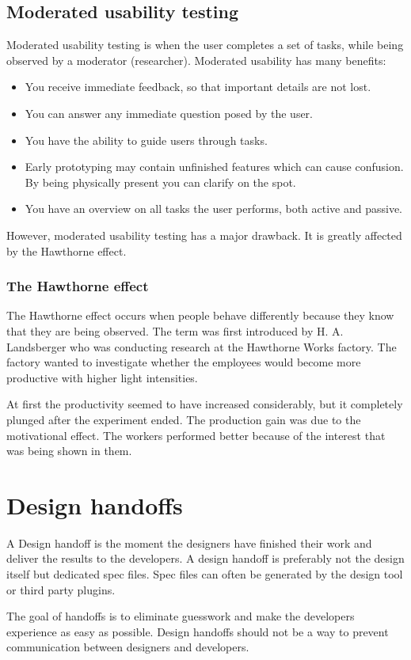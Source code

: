     \subsection{Moderated usability testing}  
    Moderated usability testing is when the user completes a set of tasks, while being observed by a moderator (researcher).
    Moderated usability has many benefits: 
    \begin{itemize}
        \setlength\itemsep{-2pt} 
        \item { You receive immediate feedback, so that important details are not lost.}
        \item { You can answer any immediate question posed by the user.}
        \item { You have the ability to guide users through tasks.}
        \item { Early prototyping may contain unfinished features which can cause confusion. By being physically present you can clarify on the spot.}
        \item { You have an overview on all tasks the user performs, both active and passive.}
    \end{itemize} 
    
    However, moderated usability testing has a major drawback. It is greatly affected by the Hawthorne effect.

    \subsubsection{The Hawthorne effect}
    The Hawthorne effect occurs when people behave differently because they know that they are being observed. The term was first introduced by H. A. Landsberger who was conducting research at the Hawthorne Works factory. The factory wanted to investigate whether the employees would become more productive with higher light intensities. 
    
    At first the productivity seemed to have increased considerably, but it completely plunged after the experiment ended. The production gain was due to the motivational effect. The workers performed better because of the interest that was being shown in them.
    
    \section{Design handoffs}
    A Design handoff is the moment the designers have finished their work and deliver the results to the developers. A design handoff is preferably not the design itself but dedicated spec files. Spec files can often be generated by the design tool or third party plugins.
    
    
    The goal of handoffs is to eliminate guesswork and make the developers experience as easy as possible. 
    Design handoffs should not be a way to prevent communication between designers and developers. 
    